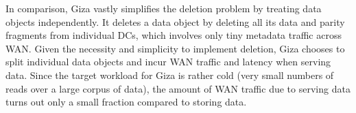 In comparison, Giza vastly simplifies the deletion problem by treating data objects independently. It deletes a data object by deleting all its data and parity fragments from individual DCs, which involves only tiny metadata traffic across WAN.
Given the necessity and simplicity to implement deletion, Giza chooses to split individual data objects and incur WAN traffic and latency when serving data. Since the target workload for Giza is rather cold (very small numbers of reads over a large corpus of data), the amount of WAN traffic due to serving data turns out only a small fraction compared to storing data.

